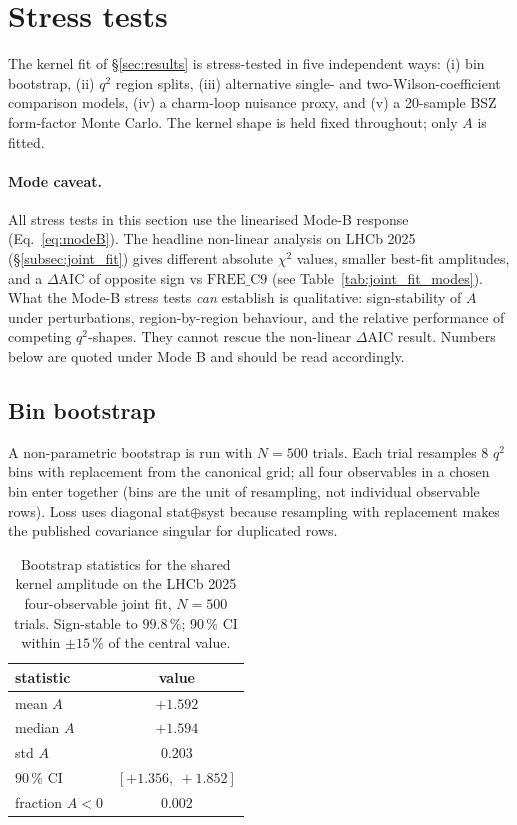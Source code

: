 \section{Stress tests}\label{sec:stress}

The kernel fit of \S\ref{sec:results} is stress-tested in five
independent ways: (i) bin bootstrap, (ii) $q^{2}$ region splits, (iii)
alternative single- and two-Wilson-coefficient comparison models,
(iv) a charm-loop nuisance proxy, and (v) a 20-sample BSZ
form-factor Monte Carlo. The kernel shape is held fixed throughout;
only $A$ is fitted.

\paragraph{Mode caveat.} All stress tests in this section use the
linearised Mode-B response (Eq.~\ref{eq:modeB}). The headline non-linear
analysis on LHCb 2025 (\S\ref{subsec:joint_fit}) gives different
absolute $\chi^{2}$ values, smaller best-fit amplitudes, and a
$\Delta\mathrm{AIC}$ of opposite sign vs $\mathrm{FREE\_C9}$ (see
Table~\ref{tab:joint_fit_modes}). What the Mode-B stress tests
\emph{can} establish is qualitative: sign-stability of $A$ under
perturbations, region-by-region behaviour, and the relative
performance of competing $q^{2}$-shapes. They cannot rescue the
non-linear $\Delta\mathrm{AIC}$ result. Numbers below are quoted
under Mode B and should be read accordingly.

\subsection{Bin bootstrap}

A non-parametric bootstrap is run with $N=500$ trials. Each trial
resamples 8 $q^{2}$ bins with replacement from the canonical grid;
all four observables in a chosen bin enter together (bins are the
unit of resampling, not individual observable rows). Loss uses
diagonal stat$\oplus$syst because resampling with replacement makes
the published covariance singular for duplicated rows.

\begin{table}[h]
\centering
\small
\begin{tabular}{lc}
\toprule
statistic & value \\
\midrule
mean $A$         & $+1.592$ \\
median $A$       & $+1.594$ \\
std $A$          & $0.203$ \\
$90\,\%$ CI      & $[+1.356,\ +1.852]$ \\
fraction $A<0$   & $0.002$ \\
\bottomrule
\end{tabular}
\caption{Bootstrap statistics for the shared kernel amplitude on
the LHCb 2025 four-observable joint fit, $N=500$ trials. Sign-stable
to $99.8\,\%$; 90\,\% CI within $\pm 15\,\%$ of the central value.}
\label{tab:bootstrap}
\end{table}

